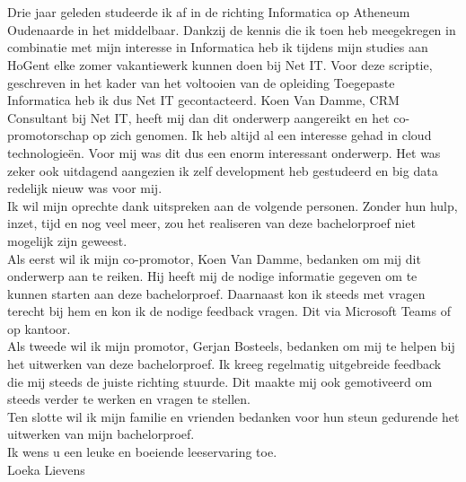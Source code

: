 
\chapter*{}%
\label{ch:voorwoord}


Drie jaar geleden studeerde ik af in de richting Informatica op Atheneum Oudenaarde in het middelbaar. Dankzij de kennis die ik toen heb meegekregen in combinatie met mijn interesse in Informatica heb ik tijdens mijn studies aan HoGent elke zomer vakantiewerk kunnen doen bij Net IT. Voor deze scriptie, geschreven in het kader van het voltooien van de opleiding Toegepaste Informatica heb ik dus Net IT gecontacteerd. Koen Van Damme, CRM Consultant bij Net IT, heeft mij dan dit onderwerp aangereikt en het co-promotorschap op zich genomen. Ik heb altijd al een interesse gehad in cloud technologieën. Voor mij was dit dus een enorm interessant onderwerp. Het was zeker ook uitdagend aangezien ik zelf development heb gestudeerd en big data redelijk nieuw was voor mij.\\

Ik wil mijn oprechte dank uitspreken aan de volgende personen. Zonder hun hulp, inzet, tijd en nog veel meer, zou het realiseren van deze bachelorproef niet mogelijk zijn geweest.\\

Als eerst wil ik mijn co-promotor, Koen Van Damme, bedanken om mij dit onderwerp aan te reiken. Hij heeft mij de nodige informatie gegeven om te kunnen starten aan deze bachelorproef. Daarnaast kon ik steeds met vragen terecht bij hem en kon ik de nodige feedback vragen. Dit via Microsoft Teams of op kantoor.\\

Als tweede wil ik mijn promotor, Gerjan Bosteels, bedanken om mij te helpen bij het uitwerken van deze bachelorproef. Ik kreeg regelmatig uitgebreide feedback die mij steeds de juiste richting stuurde. Dit maakte mij ook gemotiveerd om steeds verder te werken en vragen te stellen.\\

Ten slotte wil ik mijn familie en vrienden bedanken voor hun steun gedurende het uitwerken van mijn bachelorproef.\\

Ik wens u een leuke en boeiende leeservaring toe.\\

Loeka Lievens